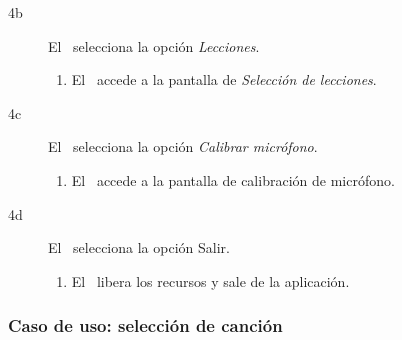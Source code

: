 \begin{description}
\begin{description}
  \item[4b] El \jugador\ selecciona la opción \textit{Lecciones}.
    \begin{enumerate}
    \item El \sistema\ accede a la pantalla de \textit{Selección de lecciones}.
    \end{enumerate}
  \item[4c] El \jugador\ selecciona la opción \textit{Calibrar micrófono}.
    \begin{enumerate}
    \item El \sistema\ accede a la pantalla de calibración de micrófono.
    \end{enumerate}
  \item [4d] El \jugador\ selecciona la opción Salir.
    \begin{enumerate}
    \item El \sistema\ libera los recursos y sale de la aplicación.\\
    \end{enumerate}
  \end{description}  
\end{description}


\subsubsection{Caso de uso: selección de canción}

